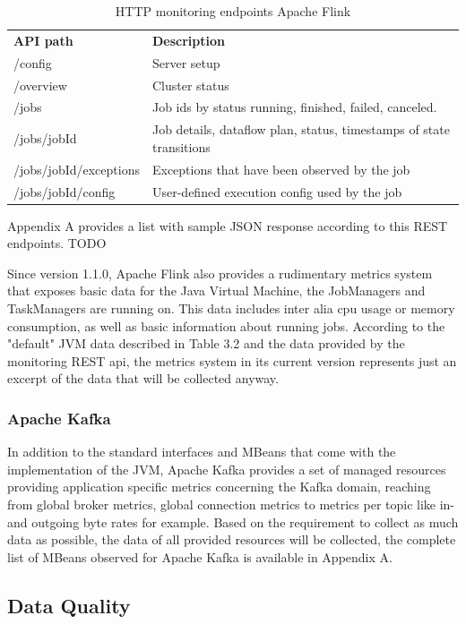 \begin{table}[H]
    \begin{tabular}{ll}
        \textbf{API path} & \textbf{Description} \\
        /config & Server setup \\
        /overview & Cluster status \\
        /jobs & Job ids by status running, finished, failed, canceled. \\
        /jobs/{jobId} & Job details, dataflow plan, status, timestamps of state transitions \\
        /jobs/{jobId}/exceptions &  Exceptions that have been observed by the job \\
        /jobs/{jobId}/config & User-defined execution config used by the job \\
    \end{tabular}
    \caption{HTTP monitoring endpoints Apache Flink}
    \label{tbl:http-api-flink}
\end{table}

Appendix A provides a list with sample JSON response according to this REST endpoints. TODO

Since version 1.1.0, Apache Flink also provides a rudimentary metrics system that exposes
basic data for the Java Virtual Machine, the JobManagers and TaskManagers are running
on. This data includes inter alia cpu usage or memory consumption, as well as basic
information about running jobs. According to the "default" JVM data described in Table 3.2
and the data provided by the monitoring REST api, the metrics system in its current version
represents just an excerpt of the data that will be collected anyway.

\subsubsection{Apache Kafka}

In addition to the standard interfaces and MBeans that come with the implementation
of the JVM, Apache Kafka provides a set of managed resources providing application
specific metrics concerning the Kafka domain, reaching from global broker metrics, global
connection metrics to metrics per topic like in- and outgoing byte rates for example. Based
on the requirement to collect as much data as possible, the data of all provided resources
will be collected, the complete list of MBeans observed for Apache Kafka is available in
Appendix A.

\subsection{Data Quality}


